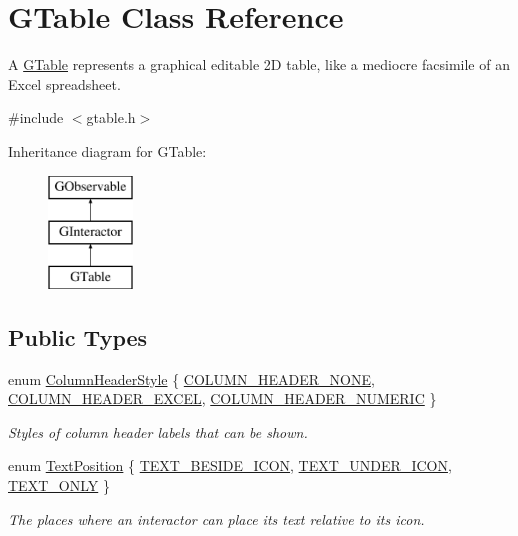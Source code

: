 \hypertarget{classGTable}{}\section{G\+Table Class Reference}
\label{classGTable}


A \mbox{\hyperlink{classGTable}{G\+Table}} represents a graphical editable 2D table, like a mediocre facsimile of an Excel spreadsheet.  




{\ttfamily \#include $<$gtable.\+h$>$}

Inheritance diagram for G\+Table\+:\begin{figure}[H]
\begin{center}
\leavevmode
\includegraphics[height=3.000000cm]{classGTable}
\end{center}
\end{figure}
\subsection*{Public Types}
\begin{DoxyCompactItemize}
\item 
enum \mbox{\hyperlink{classGTable_a060cff504451bbb98530e64e936e2671}{Column\+Header\+Style}} \{ \mbox{\hyperlink{classGTable_a060cff504451bbb98530e64e936e2671a64e90531468e72442ee778fe31accdf6}{C\+O\+L\+U\+M\+N\+\_\+\+H\+E\+A\+D\+E\+R\+\_\+\+N\+O\+NE}}, 
\mbox{\hyperlink{classGTable_a060cff504451bbb98530e64e936e2671aa4b2febb21afe5d988ac57d4bac55a8b}{C\+O\+L\+U\+M\+N\+\_\+\+H\+E\+A\+D\+E\+R\+\_\+\+E\+X\+C\+EL}}, 
\mbox{\hyperlink{classGTable_a060cff504451bbb98530e64e936e2671ab59182f94a821e007f1ede2dd29b23cd}{C\+O\+L\+U\+M\+N\+\_\+\+H\+E\+A\+D\+E\+R\+\_\+\+N\+U\+M\+E\+R\+IC}}
 \}
\begin{DoxyCompactList}\small\item\em Styles of column header labels that can be shown. \end{DoxyCompactList}\item 
enum \mbox{\hyperlink{classGInteractor_a8e0d441725a81d2bbdebbea09078260e}{Text\+Position}} \{ \mbox{\hyperlink{classGInteractor_a8e0d441725a81d2bbdebbea09078260ea4cd6f2e7d5a08d6f4dc052df2358f774}{T\+E\+X\+T\+\_\+\+B\+E\+S\+I\+D\+E\+\_\+\+I\+C\+ON}}, 
\mbox{\hyperlink{classGInteractor_a8e0d441725a81d2bbdebbea09078260eaa88490f63d8de68d44c83bdb2ecde3b3}{T\+E\+X\+T\+\_\+\+U\+N\+D\+E\+R\+\_\+\+I\+C\+ON}}, 
\mbox{\hyperlink{classGInteractor_a8e0d441725a81d2bbdebbea09078260ea39a6f388a30ac4fefb6eb13e846bc9f2}{T\+E\+X\+T\+\_\+\+O\+N\+LY}}
 \}
\begin{DoxyCompactList}\small\item\em The places where an interactor can place its text relative to its icon. \end{DoxyCompactList}\end{DoxyCompactItemize}
